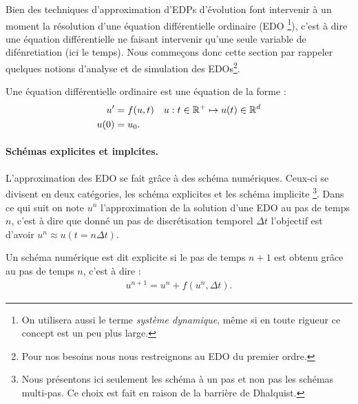 Bien des techniques d'approximation d'EDPs d'évolution font intervenir à un moment la résolution d'une équation différentielle ordinaire (EDO
\footnote{On utilisera aussi le terme \textit{système dynamique}, même si en toute rigueur ce concept est un peu plus large.}),
c'est à dire une équation différentielle ne faisant intervenir qu'une seule variable de difénretiation (ici le temps). Nous commeçons donc cette section par rappeler 
quelques notions d'analyse et de simulation des EDOs\footnote{Pour nos besoins nous nous restreignons au EDO du premier ordre.}.\par

\begin{definition}
    Une équation différentielle ordinaire est une équation de la forme :
    \begin{align}
        u' &= f(u,t)\quad u : t \in \mathbb{R}^+ \mapsto u(t) \in \mathbb{R}^d\\\notag
        u(0)&=u_0.
    \end{align}
\end{definition}
\paragraph{Schémas explicites et implcites.}
L'approximation des EDO se fait grâce à des schéma numériques. Ceux-ci se divisent en deux catégories, les schéma explicites et les schéma implicite
\footnote{Nous présentons ici seulement les schéma à un pas et non pas les schémas multi-pas. Ce choix est fait en raison de la barrière de Dhalquist.}.
Dans ce qui suit on note $u^n$ l'approximation de la solution d'une EDO au pas de temps $n$, c'est à dire que donné un pas de discrétisation temporel $\Delta t$
l'objectif est d'avoir $u^n \approx u(t=n\Delta t)$.

\begin{definition}
    Un schéma numérique est dit explicite si le pas de temps $n+1$ est obtenu grâce au pas de temps $n$, c'est à dire : 
    \begin{align}
        u^{n+1} = u^n + f(u^n ,\Delta t ).
    \end{align}
\end{definition}

